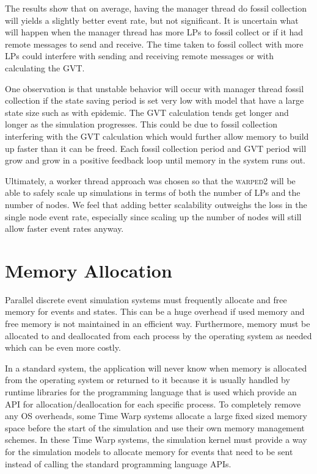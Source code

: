 \documentclass[11pt]{book}
\begin{document}
The results show that on average, having the manager thread do fossil collection will yields a
slightly better event rate, but not significant.  It is uncertain what will happen when the
manager thread has more LPs to fossil collect or if it had remote messages to send and receive.
The time taken to fossil collect with more LPs could interfere with sending and receiving remote
messages or with calculating the GVT.

One observation is that unstable behavior will occur with manager thread fossil collection
if the state saving period is set very low with model that have a large state size such as with
epidemic.  The GVT calculation tends get longer and longer as the simulation progresses.  This could
be due to fossil collection interfering with the GVT calculation which would further allow memory
to build up faster than it can be freed.  Each fossil collection period and GVT period will grow
and grow in a positive feedback loop until memory in the system runs out.

Ultimately, a worker thread approach was chosen so that the \textsc{warped2} will be able to
safely scale up simulations in terms of both the number of LPs and the number of nodes.  We feel
that adding better scalability outweighs the loss in the single node event rate, especially since
scaling up the number of nodes will still allow faster event rates anyway.

\section{Memory Allocation}

Parallel discrete event simulation systems must frequently allocate and free memory for
events and states.  This can be a huge overhead if used memory and free memory is not
maintained in an efficient way.  Furthermore, memory must be allocated to and deallocated from
each process by the operating system as needed which can be even more costly.

In a standard system, the application will never know when memory is allocated from the operating
system or returned to it because it is usually handled by runtime libraries for the programming
language that is used which provide an API for allocation/deallocation for each specific
process.  To completely remove any OS overheads, some Time Warp systems allocate a large fixed
sized memory space before the start of the simulation and use their own memory management
schemes.  In these Time Warp systems, the simulation kernel must provide a way for the simulation
models to allocate memory for events that need to be sent instead of calling the standard programming
language APIs.
\end{document}
